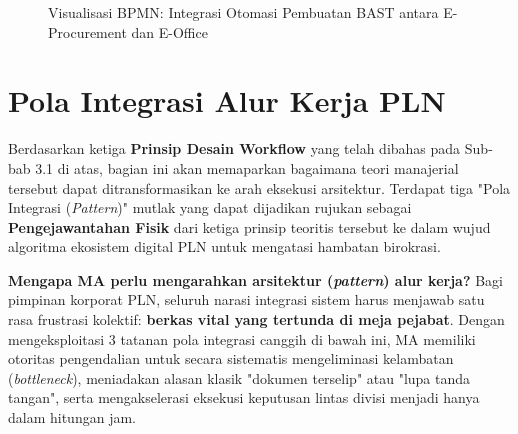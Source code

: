 \documentclass[12pt,a4paper]{report}
\begin{document}
\begin{figure}[htbp]
{%
}
\caption{Visualisasi BPMN: Integrasi Otomasi Pembuatan BAST antara E-Procurement dan E-Office}
\label{fig:bpmn-bast-example}
\end{figure}

\section{Pola Integrasi Alur Kerja PLN}
Berdasarkan ketiga \textbf{Prinsip Desain Workflow} yang telah dibahas pada Sub-bab 3.1 di atas, bagian ini akan memaparkan bagaimana teori manajerial tersebut dapat ditransformasikan ke arah eksekusi arsitektur. Terdapat tiga "Pola Integrasi (\textit{Pattern})" mutlak yang dapat dijadikan rujukan sebagai \textbf{Pengejawantahan Fisik} dari ketiga prinsip teoritis tersebut ke dalam wujud algoritma ekosistem digital PLN untuk mengatasi hambatan birokrasi.

\begin{plnbox}
\small
\textbf{Mengapa MA perlu mengarahkan arsitektur (\textit{pattern}) alur kerja?}
Bagi pimpinan korporat PLN, seluruh narasi integrasi sistem harus menjawab satu rasa frustrasi kolektif: \textbf{berkas vital yang tertunda di meja pejabat}. Dengan mengeksploitasi 3 tatanan pola integrasi canggih di bawah ini, MA memiliki otoritas pengendalian untuk secara sistematis mengeliminasi kelambatan (\textit{bottleneck}), meniadakan alasan klasik "dokumen terselip" atau "lupa tanda tangan", serta mengakselerasi eksekusi keputusan lintas divisi menjadi hanya dalam hitungan jam.
\end{plnbox}
\end{document}
